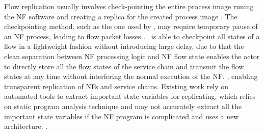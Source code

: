 Flow replication usually involves check-pointing the entire process image \ac{ runing the NF software}  and creating a replica for the created process image \cite{sherry2015rollback} \cite{rajagopalan2013pico}. The checkpointing method, such as the one used by \cite{sherry2015rollback}, may require temporary pause of an NF process, leading to flow packet losses . \nfactor~is able to checkpoint all states of a flow in a lightweight fashion without introducing large delay, due to that the clean separation between NF processing logic and NF flow state enables the actor to directly store all the flow states of the service chain and transmit the flow states at any time without interfering the normal execution of the NF. , enabling transparent replication of NFs and service chains.  Existing work \cite{sherry2015rollback} rely on automated tools to extract important state variables for replicating, which \ac{relies on static program analysis technique and may not accurately extract all the important state variables if the NF program is complicated and uses a new architecture}. .







